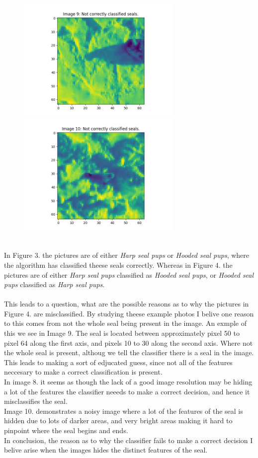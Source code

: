 \documentclass[12pt, letterpaper]{article}
\begin{document}
\begin{figure}[H]
        \includegraphics[width=8cm]{notcorr9}
        \includegraphics[width=8cm]{notcorr10}
      \end{figure}\\
      \noindent In Figure 3. the pictures are of either \textit{Harp seal pups} or \textit{Hooded seal pups}, where the algorithm has classified theese seals correctly. Whereas in Figure 4. the pictures are of either \textit{Harp seal pups} classified as \textit{Hooded seal pups}, or \textit{Hooded seal pups} classified as \textit{Harp seal pups}.\\
      \\
      This leads to a question, what are the possible reasons as to why the pictures in Figure 4. are misclassified. By studying theese example photos I belive one reason to this comes from not the whole seal being present in the image. An exmple of this we see in Image 9. The seal is located between approximately pixel 50 to pixel 64 along the first axis, and pixels 10 to 30 along the second axis. Where not the whole seal is present, althoug we tell the classifier there is a seal in the image. This leads to making a sort of edjucated guess, since not all of the features neccesary to make a correct classification is present.\\
      In image 8. it seems as though the lack of a good image resolution may be hiding a lot of the features the classifier neeeds to make a correct decision, and hence it misclassifies the seal.\\
      Image 10. demonstrates a noisy image where a lot of the features of the seal is hidden due to lots of darker areas, and very bright areas making it hard to pinpoint where the seal begins and ends.\\
      In conclusion, the reason as to why the classifier fails to make a correct decision I belive arise when the images hides the distinct features of the seal.
\end{document}
